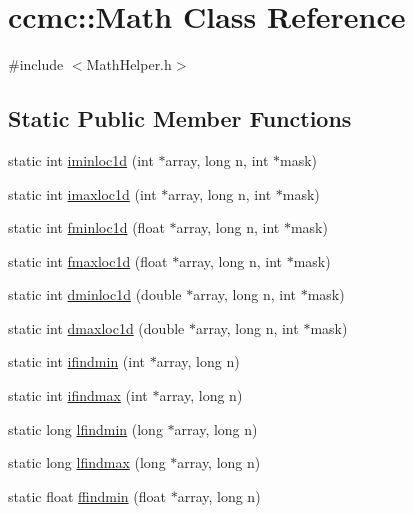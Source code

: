 \hypertarget{classccmc_1_1_math}{\section{ccmc\-:\-:Math Class Reference}
\label{classccmc_1_1_math}
}


{\ttfamily \#include $<$Math\-Helper.\-h$>$}

\subsection*{Static Public Member Functions}
\begin{DoxyCompactItemize}
\item 
static int \hyperlink{classccmc_1_1_math_ab05a171a6b685f2b1c07901ef9c2ded9}{iminloc1d} (int $\ast$array, long n, int $\ast$mask)
\item 
static int \hyperlink{classccmc_1_1_math_a92070fd808203a0fe81dc53089708521}{imaxloc1d} (int $\ast$array, long n, int $\ast$mask)
\item 
static int \hyperlink{classccmc_1_1_math_a40a880e67cc22db10e68ba72474fb8e6}{fminloc1d} (float $\ast$array, long n, int $\ast$mask)
\item 
static int \hyperlink{classccmc_1_1_math_a9dee687c24c895f0ccea2d9371766b0a}{fmaxloc1d} (float $\ast$array, long n, int $\ast$mask)
\item 
static int \hyperlink{classccmc_1_1_math_ae62fdb20482a7a06adf6afaaedd55876}{dminloc1d} (double $\ast$array, long n, int $\ast$mask)
\item 
static int \hyperlink{classccmc_1_1_math_a0467fc7d7fdc551adcb57cb59c041135}{dmaxloc1d} (double $\ast$array, long n, int $\ast$mask)
\item 
static int \hyperlink{classccmc_1_1_math_a0b155bfddb31df0c9229c1bff16e2671}{ifindmin} (int $\ast$array, long n)
\item 
static int \hyperlink{classccmc_1_1_math_a14ff2930312ff21a36b5f15e7cfd7e75}{ifindmax} (int $\ast$array, long n)
\item 
static long \hyperlink{classccmc_1_1_math_a9adf861936ca718bd1748f95a287c2af}{lfindmin} (long $\ast$array, long n)
\item 
static long \hyperlink{classccmc_1_1_math_a24a0bbd318312d720b3546174df855ec}{lfindmax} (long $\ast$array, long n)
\item 
static float \hyperlink{classccmc_1_1_math_a482d6e6c8176f58b2c7fb60ab3a16d07}{ffindmin} (float $\ast$array, long n)
\item 

\end{DoxyCompactItemize}
